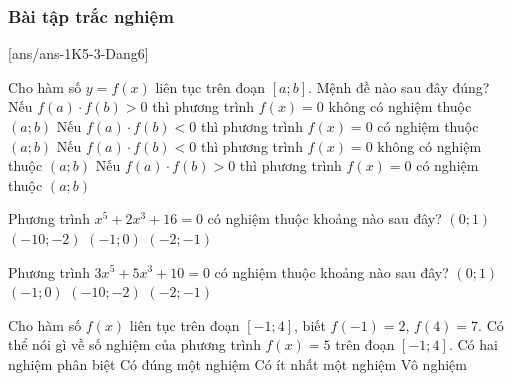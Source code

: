\subsubsection{Bài tập trắc nghiệm}

\setcounter{ex}{0}
[ans/ans-1K5-3-Dang6]
\begin{ex}%
	Cho hàm số $y=f(x)$ liên tục trên đoạn $[a;b]$. Mệnh đề nào sau đây đúng?
	\choice
	{Nếu $f(a)\cdot f(b)>0$ thì phương trình $f(x)=0$ không có nghiệm thuộc $(a ; b)$}
	{\True Nếu $f(a)\cdot f(b)<0$ thì phương trình $f(x)=0$ có nghiệm thuộc $(a ; b)$}
	{Nếu $f(a)\cdot f(b)<0$ thì phương trình $f(x)=0$ không có nghiệm thuộc $(a ; b)$}
	{Nếu $f(a)\cdot f(b)>0$ thì phương trình $f(x)=0$ có nghiệm thuộc $(a ; b)$}
\end{ex}

\begin{ex}%
	Phương trình $x^5+2x^3+16=0$ có nghiệm thuộc khoảng nào sau đây?
	\choice
	{$(0;1)$}
	{$(-10;-2)$}
	{$(-1;0)$}
	{\True $(-2;-1)$}
\end{ex}

\begin{ex}%
	Phương trình $ 3x^5+5x^3+10=0 $ có nghiệm thuộc khoảng nào sau đây?
	\choice
	{$ (0;1) $}
	{$ (-1;0) $}
	{$ (-10;-2) $}
	{\True $ (-2;-1) $}
\end{ex}

\begin{ex}%
Cho hàm số $f(x)$ liên tục trên đoạn $[-1 ; 4]$, biết $f(-1)=2$, $f(4)=7$. Có thể nói gì về số nghiệm của phương trình $f(x)=5$ trên đoạn $[-1 ; 4]$.	
	\choice
	{Có hai nghiệm phân biệt }
	{Có đúng một nghiệm}
	{\True Có ít nhất một nghiệm}
	{Vô nghiệm}
\end{ex}

